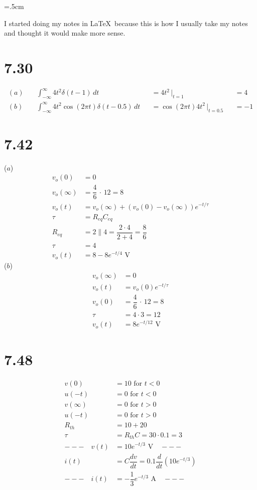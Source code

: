 \documentclass[a4paper,12pt,openany]{article}
\newcommand{\parenth}[1]{
    \left(#1\right)
}
\begin{document}
\parskip=.5cm
\parindent=0cm

I started doing my notes in \LaTeX \, because this is how I usually take my notes and thought it would make more sense.
\section*{7.30}
\begin{align*}
    (a) \quad & \int_{-\infty}^{\infty} 4t^2 \delta(t-1) \, dt &&= 4t^2 \, \Big|_{t=1} &&= 4 \\
    (b) \quad & \int_{-\infty}^{\infty} 4t^2 \cos(2\pi t) \delta(t-0.5) \, dt &&= \cos(2\pi t) 4t^2 \, \Big|_{t=0.5} &&= -1
\end{align*}

\section*{7.42}
($a$)
\begin{align*}
    v_o(0) &= 0 \\
    v_o(\infty) &= \dfrac{4}{6} \,\cdot \, 12 = 8 \\
    v_o(t) &= v_o(\infty) + (v_o(0) - v_o(\infty))e^{-t/\tau} \\
    \tau &= R_{eq} C_{eq} \\
    R_{eq} &= 2 \parallel 4 = \dfrac{2 \cdot 4}{2 + 4} = \dfrac{8}{6} \\
    \tau &= 4 \\
    v_o(t) &= 8 - 8e^{-t/4} \text{ V}
\end{align*}
($b$)
\begin{align*}
    v_o(\infty) &= 0 \\
    v_o(t) &= v_o(0)e^{-t/\tau} \\
    v_o(0) &= \dfrac{4}{6} \, \cdot \, 12 = 8 \\
    \tau &= 4 \cdot 3 = 12 \\
    v_o(t) &= 8e^{-t/12} \text{ V}
\end{align*}

\section*{7.48}
\begin{align*}
    v(0) &= 10 \text{ for } t < 0 \\
    u(-t) &= 0 \text{ for } t < 0 \\
    v(\infty) &= 0 \text{ for } t > 0 \\
    u(-t) &= 0 \text{ for } t > 0 \\
    R_{th} &= 10 + 20 \\
    \tau &= R_{th} C = 30 \cdot 0.1 = 3 \\
    --- \quad v(t) &= 10e^{-t/3} \text{ V}\quad --- \\
    i(t) &= C \dfrac{dv}{dt} = 0.1 \dfrac{d}{dt} \parenth{10e^{-t/3}} \\
    --- \quad i(t) &= -\dfrac{1}{3}e^{-t/3} \text{ A} \quad ---
\end{align*}
\end{document}
